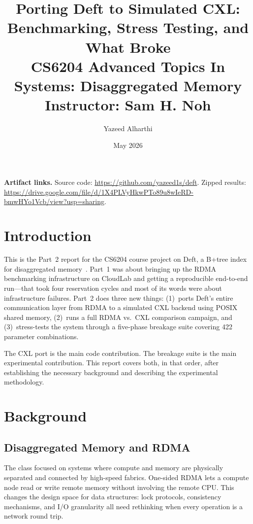 \documentclass[10pt,twocolumn]{article}
\title{Porting Deft to Simulated CXL:\\Benchmarking, Stress Testing, and What Broke\\[4pt]
{\small CS6204 Advanced Topics In Systems: Disaggregated Memory \quad
Instructor: Sam H. Noh}}
\author{Yazeed Alharthi}
\date{May 2026}
\begin{document}
\maketitle

\noindent\textbf{Artifact links.}
Source code: \url{https://github.com/yazeed1s/deft}.
Zipped results: \url{https://drive.google.com/file/d/1X4PLVyHkwPTo89u8wIeRD-bmwHYo1Vcb/view?usp=sharing}.

\section{Introduction}

This is the Part~2 report for the CS6204 course project on Deft, a B+tree
index for disaggregated memory~\cite{deft2025eurosys}.
Part~1 was about bringing up the RDMA benchmarking infrastructure on CloudLab
and getting a reproducible end-to-end run---that took four reservation cycles
and most of its words were about infrastructure failures.
Part~2 does three new things: (1)~ports Deft's entire communication layer from
RDMA to a simulated CXL backend using POSIX shared memory, (2)~runs a full
RDMA vs.\ CXL comparison campaign, and (3)~stress-tests the system through a
five-phase breakage suite covering 422 parameter combinations.

The CXL port is the main code contribution.
The breakage suite is the main experimental contribution.
This report covers both, in that order, after establishing the necessary
background and describing the experimental methodology.

\section{Background}

\subsection{Disaggregated Memory and RDMA}

The class focused on systems where compute and memory are physically separated
and connected by high-speed fabrics.
One-sided RDMA lets a compute node read or write remote memory without
involving the remote CPU.
This changes the design space for data structures: lock protocols, consistency
mechanisms, and I/O granularity all need rethinking when every operation is a
network round trip.
\end{document}
